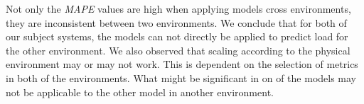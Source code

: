 Not only the \textit{MAPE} values are high when applying models cross environments, they are inconsistent between two environments. We conclude that for both of our subject systems, the models can not directly be applied to predict load for the other environment. We also observed that scaling according to the physical environment may or may not work. This is dependent on the selection of metrics in both of the environments. What might be significant in on of the models may not be applicable to the other model in another environment. 






	

